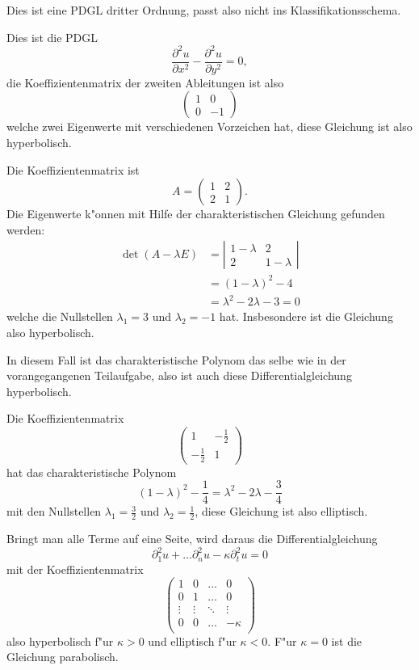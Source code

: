 \begin{loesung}
\begin{teilaufgaben}
\item Dies ist eine PDGL dritter Ordnung, passt also nicht ins
Klassifikationsschema.
\item Dies ist die PDGL
\[
\frac{\partial^2u}{\partial x^2}-\frac{\partial^2 u}{\partial y^2}=0,
\]
die Koeffizientenmatrix der zweiten Ableitungen ist also
\[
\begin{pmatrix}
1&0\\0&-1
\end{pmatrix}
\]
welche zwei Eigenwerte mit verschiedenen Vorzeichen hat, diese Gleichung
ist also hyperbolisch.
\item Die Koeffizientenmatrix ist
\[
A=\begin{pmatrix}
1&2\\2&1
\end{pmatrix}.
\]
Die Eigenwerte k"onnen mit Hilfe der charakteristischen Gleichung
gefunden werden:
\begin{align*}
\det(A-\lambda E)
&=
\left|\begin{matrix} 1-\lambda&2\\2&1-\lambda\end{matrix}\right|
\\
&=(1-\lambda)^2-4\\
&=\lambda^2-2\lambda-3=0
\end{align*}
welche die Nullstellen $\lambda_1=3$ und $\lambda_2=-1$ hat.
Insbesondere ist die Gleichung also hyperbolisch.
\item
In diesem Fall ist das charakteristische Polynom das selbe wie in
der vorangegangenen Teilaufgabe, also ist auch diese Differentialgleichung
hyperbolisch.
\item Die Koeffizientenmatrix
\[
\begin{pmatrix}
1&-\frac12\\
-\frac12&1
\end{pmatrix}
\]
hat das charakteristische Polynom
\[
(1-\lambda)^2-\frac14=\lambda^2-2\lambda-\frac34
\]
mit den Nullstellen $\lambda_1=\frac32$ und $\lambda_2=\frac12$,
diese Gleichung ist also elliptisch.
\item
Bringt man alle Terme auf eine Seite, wird daraus die Differentialgleichung
\[
\partial_1^2u+\dots\partial_n^2u-\kappa\partial_t^2u=0
\]
mit der Koeffizientenmatrix
\[
\begin{pmatrix}
1&0&\dots&0\\
0&1&\dots&0\\
\vdots&\vdots&\ddots&\vdots\\
0&0&\dots&-\kappa\\
\end{pmatrix}
\]
also hyperbolisch f"ur $\kappa > 0$ und elliptisch f"ur $\kappa < 0$.
F"ur $\kappa=0$ ist die Gleichung parabolisch.
\end{teilaufgaben}
\end{loesung}
